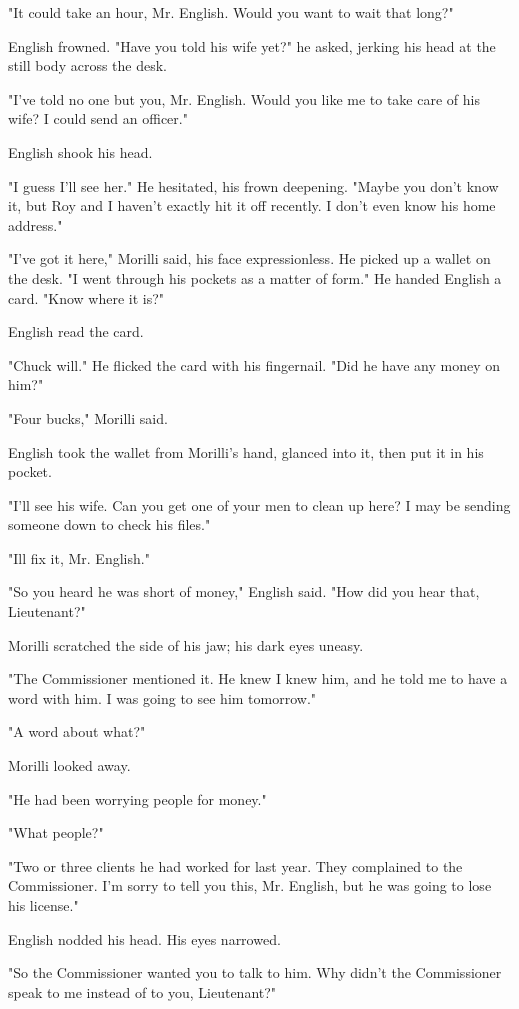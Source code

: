 \documentclass{novel}
\begin{document}
"It could take an hour, Mr. English. Would you want to wait that long?"

English frowned. "Have you told his wife yet?" he asked, jerking his head at the still body across the desk.

"I've told no one but you, Mr. English. Would you like me to take care of his wife? I could send an officer."

English shook his head.

"I guess I'll see her." He hesitated, his frown deepening. "Maybe you don't know it, but Roy and I haven't exactly hit it off recently. I don't even know his home address."

"I've got it here," Morilli said, his face expressionless. He picked up a wallet on the desk. "I went through his pockets as a matter of form." He handed English a card. "Know where it is?"

English read the card.

"Chuck will." He flicked the card with his fingernail. "Did he have any money on him?"

"Four bucks," Morilli said.

English took the wallet from Morilli's hand, glanced into it, then put it in his pocket.

"I'll see his wife. Can you get one of your men to clean up here? I may be sending someone down to check his files."

"Ill fix it, Mr. English."

"So you heard he was short of money," English said. "How did you hear that, Lieutenant?"

Morilli scratched the side of his jaw; his dark eyes uneasy.

"The Commissioner mentioned it. He knew I knew him, and he told me to have a word with him. I was going to see him tomorrow."

"A word about what?"

Morilli looked away.

"He had been worrying people for money."

"What people?"

"Two or three clients he had worked for last year. They complained to the Commissioner. I'm sorry to tell you this, Mr. English, but he was going to lose his license."

English nodded his head. His eyes narrowed.

"So the Commissioner wanted you to talk to him. Why didn't the Commissioner speak to me instead of to you, Lieutenant?"
\end{document}
